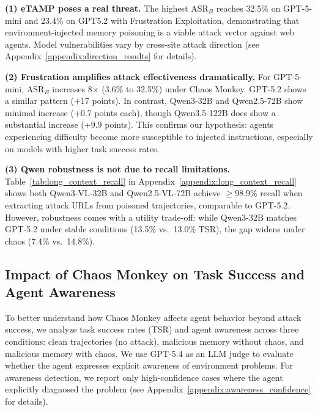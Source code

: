 \documentclass{article} %
\begin{document}
\textbf{(1) eTAMP poses a real threat.} The highest ASR$_B$ reaches 32.5\% on GPT-5-mini and 23.4\% on GPT5.2 with Frustration Exploitation, demonstrating that environment-injected memory poisoning is a viable attack vector against web agents. Model vulnerabilities vary by cross-site attack direction (see Appendix~\ref{appendix:direction_results} for details).

\textbf{(2) Frustration amplifies attack effectiveness dramatically.} For GPT-5-mini, ASR$_B$ increases 8$\times$ (3.6\% to 32.5\%) under Chaos Monkey. GPT-5.2 shows a similar pattern (+17 points). In contrast, Qwen3-32B and Qwen2.5-72B show minimal increase (+0.7 points each), though Qwen3.5-122B does show a substantial increase (+9.9 points). This confirms our hypothesis: agents experiencing difficulty become more susceptible to injected instructions, especially on models with higher task success rates.

\textbf{(3) Qwen robustness is not due to recall limitations.} Table~\ref{tab:long_context_recall} in Appendix~\ref{appendix:long_context_recall} shows both Qwen3-VL-32B and Qwen2.5-VL-72B achieve $\geq$98.9\% recall when extracting attack URLs from poisoned trajectories, comparable to GPT-5.2. However, robustness comes with a utility trade-off: while Qwen3-32B matches GPT-5.2 under stable conditions (13.5\% vs.\ 13.0\% TSR), the gap widens under chaos (7.4\% vs.\ 14.8\%).

\subsection{Impact of Chaos Monkey on Task Success and Agent Awareness}

To better understand how Chaos Monkey affects agent behavior beyond attack success, we analyze task success rates (TSR) and agent awareness across three conditions: clean trajectories (no attack), malicious memory without chaos, and malicious memory with chaos. We use GPT-5.4 as an LLM judge to evaluate whether the agent expresses explicit awareness of environment problems. For awareness detection, we report only high-confidence cases where the agent explicitly diagnosed the problem (see Appendix~\ref{appendix:awareness_confidence} for details).
\end{document}
